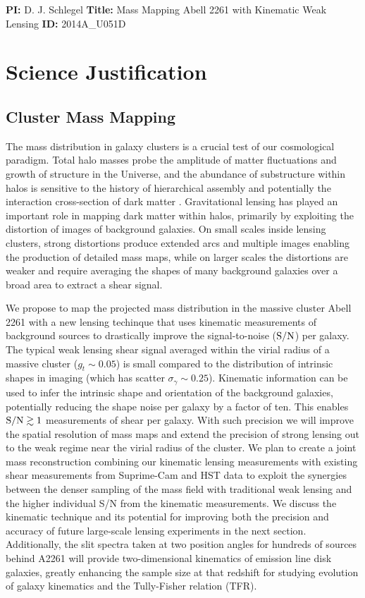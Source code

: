 \documentclass[12pt]{article}
\begin{document}
\textbf{PI:} D. J. Schlegel \textbf{Title:} Mass Mapping Abell 2261 with Kinematic Weak Lensing \textbf{ID:} 2014A\_U051D

\section{Science Justification}


\subsection{Cluster Mass Mapping}

The mass distribution in galaxy clusters is a crucial test of our cosmological paradigm. Total halo masses probe the amplitude of matter fluctuations and growth of structure in the Universe, and the abundance of substructure within halos is sensitive to the history of hierarchical assembly and potentially the interaction cross-section of dark matter \citep[e.g.,][]{Natarajan2002a, Natarajan2002b, Voit2005, Clowe2006}. Gravitational lensing has played an important role in mapping dark matter within halos, primarily by exploiting the distortion of images of background galaxies. On small scales inside lensing clusters, strong distortions produce extended arcs and multiple images enabling the production of detailed mass maps, while on larger scales the distortions are weaker and require averaging the shapes of many background galaxies over a broad area to extract a shear signal.

We propose to map the projected mass distribution in the massive cluster Abell 2261 with a new lensing techinque that uses kinematic measurements of background sources to drastically improve the signal-to-noise (${\rm S/N}$) per galaxy. The typical weak lensing shear signal averaged within the virial radius of a massive cluster ($g_t\sim0.05$) is small compared to the distribution of intrinsic shapes in imaging (which has scatter $\sigma_\gamma\sim0.25$). Kinematic information can be used to infer the intrinsic shape and orientation of the background galaxies, potentially reducing the shape noise per galaxy by a factor of ten. This enables ${\rm S/N}\gtrsim1$ measurements of shear per galaxy. With such precision we will improve the spatial resolution of mass maps and extend the precision of strong lensing out to the weak regime near the virial radius of the cluster.  We plan to create a joint mass reconstruction combining our kinematic lensing measurements with existing shear measurements from Suprime-Cam and HST data to exploit the synergies between the denser sampling of the mass field with traditional weak lensing and the higher individual S/N from the kinematic measurements. We discuss the kinematic technique and its potential for improving both the precision and accuracy of future large-scale lensing experiments in the next section. Additionally, the slit spectra taken at two position angles for hundreds of sources behind A2261 will provide two-dimensional kinematics of emission line disk galaxies, greatly enhancing the sample size at that redshift for studying evolution of galaxy kinematics and the Tully-Fisher relation (TFR).
\end{document}
